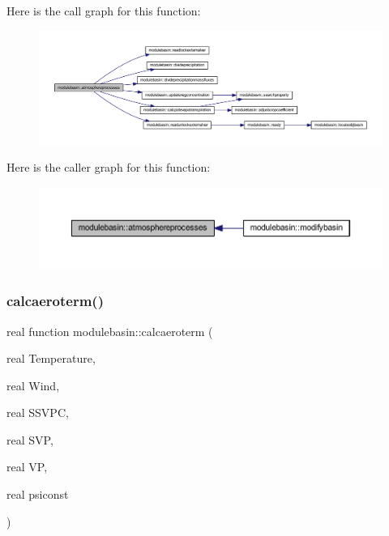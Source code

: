 Here is the call graph for this function\+:\nopagebreak
\begin{figure}[H]
\begin{center}
\leavevmode
\includegraphics[width=350pt]{namespacemodulebasin_a1dc5e66cf881f77967c196e5413f7ff2_cgraph}
\end{center}
\end{figure}
Here is the caller graph for this function\+:\nopagebreak
\begin{figure}[H]
\begin{center}
\leavevmode
\includegraphics[width=350pt]{namespacemodulebasin_a1dc5e66cf881f77967c196e5413f7ff2_icgraph}
\end{center}
\end{figure}
\mbox{\label{namespacemodulebasin_a466a2ecf0466b641fa24bb3e7847e37d}} 
\subsubsection{\texorpdfstring{calcaeroterm()}{calcaeroterm()}}
{\footnotesize\ttfamily real function modulebasin\+::calcaeroterm (\begin{DoxyParamCaption}\item[{real}]{Temperature,  }\item[{real}]{Wind,  }\item[{real}]{S\+S\+V\+PC,  }\item[{real}]{S\+VP,  }\item[{real}]{VP,  }\item[{real}]{psiconst }\end{DoxyParamCaption})\hspace{0.3cm}{\ttfamily [private]}}

